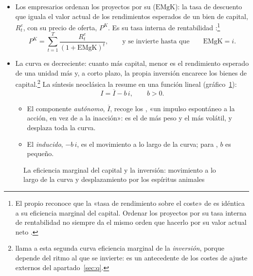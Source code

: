 \documentclass[11pt]{article}
\begin{document}
\begin{itemize}
\item Los empresarios ordenan los proyectos por su  ($\mathrm{EMgK}$): la tasa de descuento que iguala el valor actual de los rendimientos esperados de un bien de capital, $R^e_t$, con su precio de oferta, $P^K$. Es su tasa interna de rentabilidad :\footnote{El propio  reconoce que la «tasa de rendimiento sobre el coste» de \textcite{Fisher1930Theory} es idéntica a su eficiencia marginal del capital\nocite{Keynes1936}. Ordenar los proyectos por su tasa interna de rentabilidad no siempre da el mismo orden que hacerlo por su valor actual neto .}
  \begin{equation*}
  P^K=\sum_{t=1}^{T}\frac{R^e_t}{(1+\mathrm{EMgK})^t},\qquad\text{y se invierte hasta que}\qquad \mathrm{EMgK}=i.
  \end{equation*}
\item La curva es decreciente: cuanto más capital, menor es el rendimiento esperado de una unidad más y, a corto plazo, la propia inversión encarece los bienes de capital.\footnote{\textcite{Lerner1953Marginal} llama a esta segunda curva eficiencia marginal de la \emph{inversión}, porque depende del ritmo al que se invierte: es un antecedente de los costes de ajuste externos del apartado~\ref{sec:q}.} La síntesis neoclásica la resume en una función lineal (gráfico~\ref{fig:emgk}):
  \begin{equation}
  I=\overline{I}-b\,i,\qquad b>0.\label{eq:keynes}
  \end{equation}
  \begin{itemize}
  \item El componente \emph{autónomo}, $\overline{I}$, recoge los , «un impulso espontáneo a la acción, en vez de a la inacción»\nocite{Keynes1936}: es el de más peso y el más volátil, y desplaza toda la curva.
  \item El \emph{inducido}, $-b\,i$, es el movimiento a lo largo de la curva; para , $b$ es pequeño.
  \end{itemize}
\end{itemize}

\begin{figure}[H]
\centering
\caption{La eficiencia marginal del capital y la inversión: movimiento a lo largo de la curva y desplazamiento por los espíritus animales}\label{fig:emgk}
\end{figure}
\end{document}
